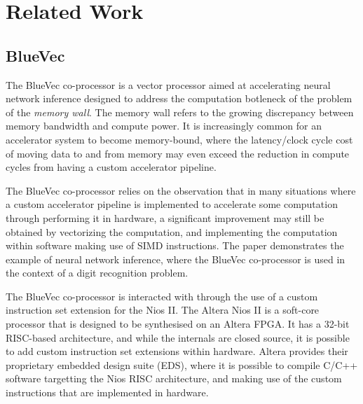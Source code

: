 \documentclass[a4paper,8pt]{report}
\begin{document}




\chapter{Related Work} 
\section{BlueVec}
The BlueVec co-processor is a vector processor aimed at accelerating neural
network inference designed to address the computation botleneck of the problem
of the \emph{memory wall}.
The memory wall refers to the growing discrepancy between memory bandwidth and
compute power. It is increasingly common for an accelerator system to become
memory-bound, where the latency/clock cycle cost of moving data to and from
memory may even exceed the reduction in compute cycles from having a custom
accelerator pipeline.

The BlueVec co-processor relies on the observation that in many situations where
a custom accelerator pipeline is implemented to accelerate some computation
through performing it in hardware, a significant improvement may still be obtained
by vectorizing the computation, and implementing the computation within
software making use of SIMD instructions. The paper demonstrates the example of
neural network inference, where the BlueVec co-processor is used in the context
of a digit recognition problem.

The BlueVec co-processor is interacted with through the use of a custom
instruction set extension for the Nios II. The Altera Nios II is a soft-core processor
that is designed to be synthesised on an Altera FPGA. It has a 32-bit RISC-based
architecture, and while the internals are closed source, it is possible to add
custom instruction set extensions within hardware. Altera provides their
proprietary embedded design suite (EDS), where it is possible to compile C/C++
software targetting the Nios RISC architecture, and making use of the custom
instructions that are implemented in hardware.
\end{document}
